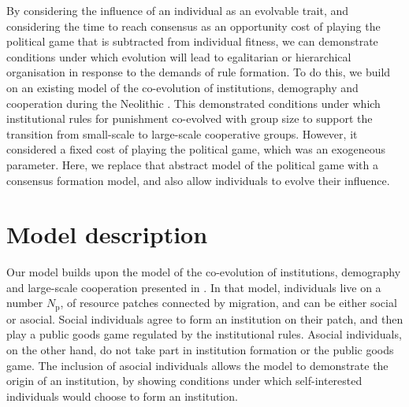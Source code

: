 \documentclass{rstb}
\begin{document}
\begin{linenumbers}
By considering the influence of an individual as an evolvable trait, and considering the time to reach consensus as an opportunity cost of playing the political game that is subtracted from individual fitness, we can demonstrate conditions under which evolution will lead to egalitarian or hierarchical organisation in response to the demands of rule formation. To do this, we build on an existing model of the co-evolution of institutions, demography and cooperation during the Neolithic \cite{Powers:2013:a}. This demonstrated conditions under which institutional rules for punishment co-evolved with group size to support the transition from small-scale to large-scale cooperative groups. However, it considered a fixed cost of playing the political game, which was an exogeneous parameter. Here, we replace that abstract model of the political game with a consensus formation model, and also allow individuals to evolve their influence. 

\section{Model description}
Our model builds upon the model of the co-evolution of institutions, demography and large-scale cooperation presented in \cite{Powers:2013:a}. In that model, individuals live on a number $N_\mathrm{p}$, of resource patches connected by migration, and can be either social or asocial. Social individuals agree to form an institution on their patch, and then play a public goods game regulated by the institutional rules. Asocial individuals, on the other hand, do not take part in institution formation or the public goods game. The inclusion of asocial individuals allows the model to demonstrate the origin of an institution, by showing conditions under which self-interested individuals would choose to form an institution. 


\end{linenumbers}
\end{document}
